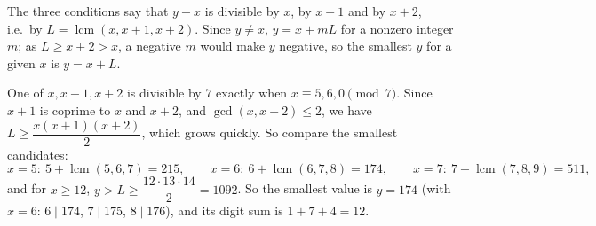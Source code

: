 The three conditions say that $y-x$ is divisible by $x$, by $x+1$ and by $x+2$, i.e.\ by $L=\operatorname{lcm}(x,x+1,x+2)$. Since $y\ne x$, $y=x+mL$ for a nonzero integer $m$; as $L\ge x+2>x$, a negative $m$ would make $y$ negative, so the smallest $y$ for a given $x$ is $y=x+L$.

One of $x,x+1,x+2$ is divisible by $7$ exactly when $x\equiv5,6,0\pmod7$. Since $x+1$ is coprime to $x$ and $x+2$, and $\gcd(x,x+2)\le2$, we have $L\ge\dfrac{x(x+1)(x+2)}{2}$, which grows quickly. So compare the smallest candidates:
\[
x=5:\ 5+\operatorname{lcm}(5,6,7)=215,\qquad x=6:\ 6+\operatorname{lcm}(6,7,8)=174,\qquad x=7:\ 7+\operatorname{lcm}(7,8,9)=511,
\]
and for $x\ge12$, $y>L\ge\dfrac{12\cdot13\cdot14}{2}=1092$. So the smallest value is $y=174$ (with $x=6$: $6\mid174$, $7\mid175$, $8\mid176$), and its digit sum is $1+7+4=\boxed{12}$.
